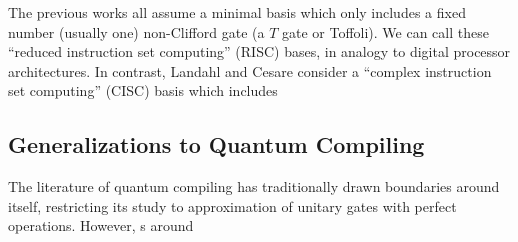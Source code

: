 The previous works all assume a minimal basis which only includes a fixed
number (usually one) non-Clifford gate (a $T$ gate or Toffoli). We can
call these ``reduced instruction set computing'' (RISC) bases, in analogy to
digital processor architectures.
In contrast, Landahl and
Cesare consider a ``complex instruction set computing'' (CISC) basis which
includes 

\subsection{Generalizations to Quantum Compiling}
\label{subsec:alt-tasks}

The literature of quantum compiling has traditionally drawn boundaries
around itself, restricting its study to approximation of unitary gates
with perfect operations. However, s
around 